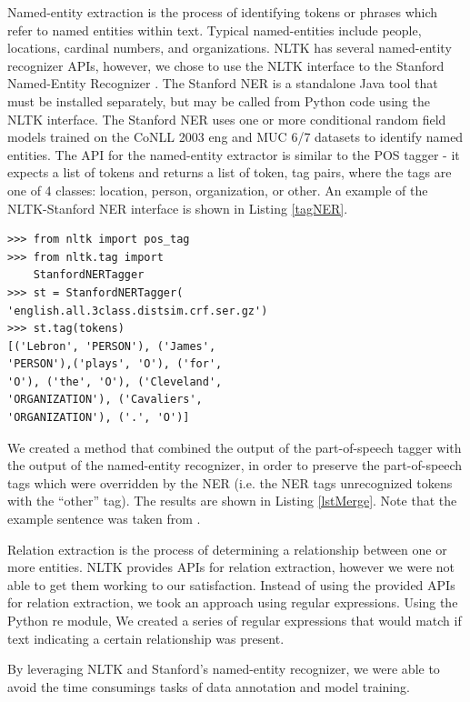 \documentclass{chi2009}
\begin{document}
Named-entity extraction is the process of identifying tokens or phrases which refer to named entities within text.  Typical named-entities include people, locations, cardinal numbers, and organizations.  NLTK has several named-entity recognizer APIs, however, we chose to use the NLTK interface to the Stanford Named-Entity Recognizer \cite{stanfordner}.  The Stanford NER is a standalone Java tool that must be installed separately, but may be called from Python code using the NLTK interface.  The Stanford NER uses one or more conditional random field models trained on the CoNLL 2003 eng \cite{conll2003} and MUC 6/7 \cite{muc6} datasets to identify named entities.  The API for the named-entity extractor is similar to the POS tagger - it expects a list of tokens and returns a list of token, tag pairs, where the tags are one of 4 classes: location, person, organization, or other. An example of the NLTK-Stanford NER interface is shown in Listing \ref{tagNER}.

\begin{lstlisting}[caption=NLTK-Stanford NER Example, label=tagNER]
>>> from nltk import pos_tag
>>> from nltk.tag import 
    StanfordNERTagger
>>> st = StanfordNERTagger(
'english.all.3class.distsim.crf.ser.gz')
>>> st.tag(tokens)
[('Lebron', 'PERSON'), ('James',
'PERSON'),('plays', 'O'), ('for',
'O'), ('the', 'O'), ('Cleveland',
'ORGANIZATION'), ('Cavaliers',
'ORGANIZATION'), ('.', 'O')]
\end{lstlisting}

We created a method that combined the output of the part-of-speech tagger with the output of the named-entity recognizer, in order to preserve the part-of-speech tags which were overridden by the NER (i.e. the NER tags unrecognized tokens with the ``other'' tag).  The results are shown in Listing \ref{lstMerge}.  Note that the example sentence was taken from \cite{cnn}.

Relation extraction is the process of determining a relationship between one or more entities.  NLTK provides APIs for relation extraction, however we were not able to get them working to our satisfaction.  Instead of using the provided APIs for relation extraction, we took an approach using regular expressions.  Using the Python re module, We created a series of regular expressions that would match if text indicating a certain relationship was present.

By leveraging NLTK and Stanford's named-entity recognizer, we were able to avoid the time consumings tasks of data annotation and model training. 
\end{document}

